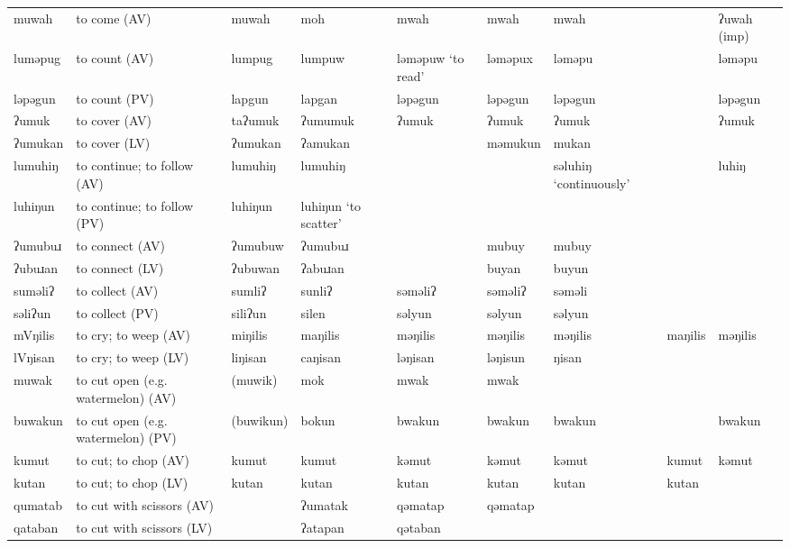 \begin{landscape}
\begin{longtable}{*{9}{>{\raggedright\arraybackslash}p{}}}
\text{*}muwah        & to come (AV) & muwah & moh & mwah & mwah & mwah &  & ʔuwah (imp)\\
\text{*}luməpug      & to count (AV) & lumpug & lumpuw & ləməpuw \newline `to read' & ləməpux & ləməpu &  & ləməpu\\
\text{*}ləpəgun      & to count (PV) & lapgun & lapgan & ləpəgun & ləpəgun & ləpəgun &  & ləpəgun\\
\text{*}ʔumuk       & to cover (AV) & taʔumuk & ʔumumuk & ʔumuk & ʔumuk & ʔumuk &  & ʔumuk\\
\text{*}ʔumukan      & to cover (LV) & ʔumukan & ʔamukan &  & məmukun & mukan &  & \\
\text{*}lumuhiŋ      & to continue; to follow (AV) & lumuhiŋ & lumuhiŋ &  &  & səluhiŋ `continuously' &  & luhiŋ\\
\text{*}luhiŋun      & to continue; to follow (PV) & luhiŋun & luhiŋun \newline `to scatter' &  &  &  &  & \\
\text{*}ʔumubuɹ      & to connect (AV) & ʔumubuw & ʔumubuɹ &  & mubuy & mubuy &  & \\
\text{*}ʔubuɹan      & to connect (LV) & ʔubuwan & ʔabuɹan &  & buyan & buyun &  & \\
\text{*}suməliʔ      & to collect (AV) & sumliʔ & sunliʔ & səməliʔ & səməliʔ & səməli &  & \\
\text{*}səliʔun      & to collect (PV) & siliʔun & silen & səlyun & səlyun & səlyun &  & \\
\text{*}mVŋilis      & to cry; to weep (AV) & miŋilis & maŋilis & məŋilis & məŋilis & məŋilis & maŋilis & məŋilis\\
\text{*}lVŋisan      & to cry; to weep (LV) & liŋisan & caŋisan & ləŋisan & ləŋisun & ŋisan &  & \\
\text{*}muwak        & to cut open (e.g. watermelon) (AV) & (muwik) & mok & mwak & mwak &  &  & \\
\text{*}buwakun      & to cut open (e.g. watermelon) (PV) & (buwikun) & bokun & bwakun & bwakun & bwakun &  & bwakun\\
\text{*}kumut        & to cut; to chop (AV) & kumut & kumut & kəmut & kəmut & kəmut & kumut & kəmut\\
\text{*}kutan        & to cut; to chop (LV) & kutan & kutan & kutan & kutan & kutan & kutan & \\
\text{*}qumatab      & to cut with scissors (AV) &  & ʔumatak & qəmatap & qəmatap &  &  & \\
\text{*}qataban      & to cut with scissors (LV) &  & ʔatapan & qətaban &  &  &  & \\

\end{longtable}
\end{landscape}
